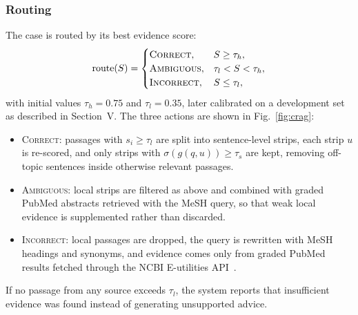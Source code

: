 \documentclass[conference]{IEEEtran}
\begin{document}
\subsubsection{Routing}
The case is routed by its best evidence score:
\begin{equation}
\text{route}(S) =
\begin{cases}
\textsc{Correct}, & S \ge \tau_h,\\
\textsc{Ambiguous}, & \tau_l < S < \tau_h,\\
\textsc{Incorrect}, & S \le \tau_l,
\end{cases}
\label{eq:route}
\end{equation}
with initial values $\tau_h = 0.75$ and $\tau_l = 0.35$, later calibrated
on a development set as described in Section~V. The three actions are
shown in Fig.~\ref{fig:crag}:
\begin{itemize}
\item \textsc{Correct}: passages with $s_i \ge \tau_l$ are split into
sentence-level strips, each strip $u$ is re-scored, and only strips with
$\sigma(g(q,u)) \ge \tau_s$ are kept, removing off-topic sentences inside
otherwise relevant passages.
\item \textsc{Ambiguous}: local strips are filtered as above and combined
with graded PubMed abstracts retrieved with the MeSH query, so that weak
local evidence is supplemented rather than discarded.
\item \textsc{Incorrect}: local passages are dropped, the query is
rewritten with MeSH headings and synonyms, and evidence comes only from
graded PubMed results fetched through the NCBI E-utilities
API~\cite{sayers2010eutils}.
\end{itemize}
If no passage from any source exceeds $\tau_l$, the system reports that
insufficient evidence was found instead of generating unsupported advice.
\end{document}
